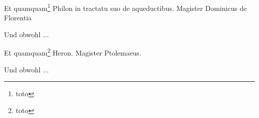 \documentclass{book}
\begin{document}
\begin{pairs}
\begin{Leftside}
\beginnumbering
\pstart
Et quamquam\footnote{toto} Philon in tractatu suo de aqueductibus. Magister Dominicus de Florentia
\pend
\endnumbering
\end{Leftside}

\begin{Rightside}
\beginnumbering
\pstart
Und obwohl ...
\pend
\endnumbering
\end{Rightside}

\end{pairs}
\Columns




\setcounter{footnoteC}{0}
\setcounter{footnote}{0}
\begin{pairs}
\begin{Leftside}
\beginnumbering
\pstart
Et quamquam\footnote{toto} Heron. Magister Ptolemaeus.
\pend
\endnumbering
\end{Leftside}

\begin{Rightside}
\beginnumbering
\pstart
Und obwohl ...
\pend
\endnumbering
\end{Rightside}

\end{pairs}
\Columns


\newpage
\printindex[res]
\printindex[pers]
\end{document}
